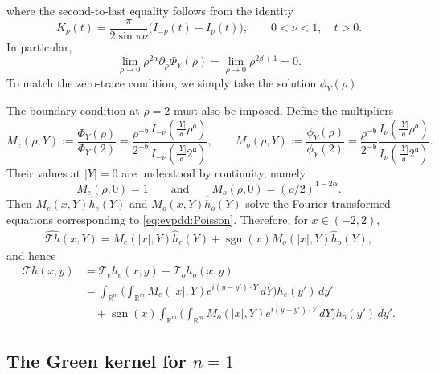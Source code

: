 \documentclass[12pt]{amsart}
\begin{document}
where the second-to-last equality follows from the identity
\begin{equation*}
    K_\nu(t) = \frac{\pi}{2\sin{\pi \nu}} \bigl( I_{-\nu}(t) - I_\nu(t) \bigr), \qquad 0<\nu<1, \quad t>0.
\end{equation*}
In particular,
\begin{equation*}
    \lim_{\rho \to 0} \rho^{2\alpha} \partial_\rho \Phi_Y(\rho) = \lim_{\rho \to 0} \rho^{2\beta+1} = 0.
\end{equation*}
To match the zero-trace condition, we simply take the solution $\phi_Y(\rho)$.

The boundary condition at $\rho =2$ must also be imposed. Define the multipliers
\begin{equation*}
    M_e(\rho,Y):= \frac{\Phi_Y(\rho)}{\Phi_Y(2)} = \frac{\rho^{-\mathfrak b}}{2^{-\mathfrak b}} \frac{I_{-\nu}\!\left(\frac{|Y|}{\mathfrak a}\rho^\mathfrak a\right)}{I_{-\nu}\!\left(\frac{|Y|}{\mathfrak a}2^\mathfrak a\right)}, \qquad M_o(\rho,Y):= \frac{\phi_Y(\rho)} {\phi_Y(2)} = \frac{\rho^{-\mathfrak b}}{2^{-\mathfrak b}} \frac{I_{\nu}\!\left(\frac{|Y|}{\mathfrak a}\rho^\mathfrak a\right)}{I_{\nu}\!\left(\frac{|Y|}{\mathfrak a}2^\mathfrak a\right)}.
\end{equation*}
Their values at $|Y|=0$ are understood by continuity, namely
\begin{equation*}
    M_e(\rho,0)=1 \qquad \text{and} \qquad M_o(\rho,0)= (\rho/2)^{1-2\alpha}.
\end{equation*}
Then $M_e(x,Y) \hat{h}_e(Y)$ and $M_o(x,Y) \hat{h}_o(Y)$ solve the Fourier-transformed equations corresponding to \eqref{eq:evpdd:Poisson}. Therefore, for $x\in (-2,2)$,
\begin{align*}
    \widehat{\mathcal{T}h}(x,Y) = M_e(|x|,Y) \hat{h}_e(Y) + \operatorname{sgn}(x) M_o(|x|,Y) \hat{h}_o(Y),
\end{align*}
and hence
\begin{align}
    \mathcal{T}h(x,y) &= \mathcal{T}_e h_e(x,y) + \mathcal{T}_o h_o(x,y) \nonumber\\
    &=\int_{\mathbb{R}^m} \biggl( \int_{\mathbb{R}^m} M_e(|x|, Y) e^{i (y-y')\cdot Y} \, dY \biggr) h_e(y') \, dy' \nonumber\\
    &\quad+ \operatorname{sgn}(x) \int_{\mathbb{R}^m} \biggl( \int_{\mathbb{R}^m} M_o(|x|, Y) e^{i (y-y')\cdot Y} \, dY \biggr) h_o(y') \, dy'.
\end{align}

\subsection{The Green kernel for \texorpdfstring{$n=1$}{n=1}}
\end{document}
